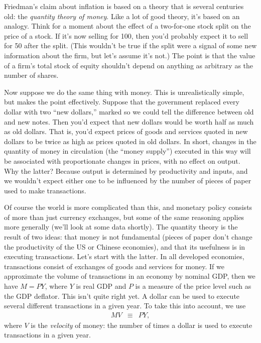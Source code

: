 Friedman's claim about inflation is based on a theory that is
several centuries old: the {\it quantity theory of
money\/}. Like a lot of good theory, it's based on an analogy. Think
for a moment about the effect of a two-for-one stock split on the
price of a stock. If it's now selling for 100, then you'd probably
expect it to sell for 50 after the split. (This wouldn't be true if
the split were a signal of some new information about the firm,
but let's assume it's not.) The point is that the value of a firm's
total stock of equity shouldn't depend on anything as arbitrary as
the number of shares.

Now suppose we do the same thing with money.  This is
unrealistically simple, but makes the point effectively. Suppose that the
government replaced every dollar with two ``new dollars,''
marked so we could tell the difference between old and new notes. Then
you'd expect that new dollars would be worth half as much
as old dollars. That is, you'd expect prices of goods and services
quoted in new dollars to be twice as high as prices quoted in old
dollars. In short, changes in the quantity of money in circulation
(the ``money supply'') executed in this way will be associated with
proportionate changes in prices, with no effect on output.  Why the
latter? Because output is determined by productivity and inputs, and
we wouldn't expect either one to be influenced by the number of
pieces of paper used to make transactions.

Of course the world is more complicated than this, and monetary
policy consists of more than just currency exchanges, but some of
the same reasoning applies more generally (we'll look at some data
shortly). The quantity theory is the result of two ideas:  that
money is not fundamental (pieces of paper don't change the
productivity of the US or Chinese economies), and that its
usefulness is in executing transactions.  Let's start with the
latter. In all developed economies, transactions consist of
exchanges of goods and services for money. If we approximate the volume of
transactions in an economy by nominal GDP, then we have
$M=PY$, where $Y$ is real GDP and $P$ is a measure of the
price level such as the GDP deflator. This isn't quite right yet. A
dollar can be used to execute several different transactions in a
given year.
To take this into account, we use
%
\begin{eqnarray}
    M V  &\equiv&  P Y,
    \label{eq:quantity_theory}
\end{eqnarray}
%
where $V$ is the \textit{velocity} of money: the number of times a
dollar is used to execute transactions in a given year.

